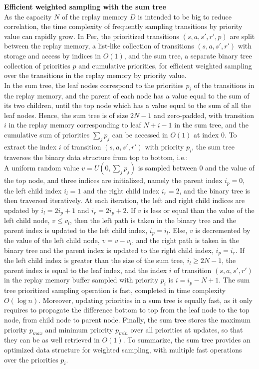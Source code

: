\textbf{Efficient weighted sampling with the sum tree} \\
As the capacity $N$ of the replay memory $D$ is intended to be big to reduce correlation, the time complexity of frequently sampling transitions by priority value can rapidly grow. In Per, the prioritized transitions $(s,a,s',r',p)$ are split between the replay memory, a list-like collection of transitions $(s,a,s',r')$ with storage and access by indices in $O(1)$, and the sum tree, a separate binary tree collection of priorities $p$ and cumulative priorities, for efficient weighted sampling over the transitions in the replay memory by priority value. \\
In the sum tree, the leaf nodes correspond to the priorities $p_i$ of the transitions in the replay memory, and the parent of each node has a value equal to the sum of its two children, until the top node which has a value equal to the sum of all the leaf nodes. Hence, the sum tree is of size $2N - 1$ and zero-padded, with transition $i$ in the replay memory corresponding to leaf $N+i-1$ in the sum tree, and the cumulative sum of priorities $\sum_j p_j$ can be accessed in $O(1)$ at index 0. To extract the index $i$ of transition $(s,a,s',r')$ with priority $p_i$, the sum tree traverses the binary data structure from top to bottom, i.e.: \\
A uniform random value $v = U(0, \sum_j p_j)$ is sampled between 0 and the value of the top node, and three indices are initialized, namely the parent index $i_p=0$, the left child index $i_l=1$ and the right child index $i_r=2$, and the binary tree is then traversed iteratively. At each iteration, the left and right child indices are updated by $i_l=2i_p+1$ and $i_r=2i_p+2$. If $v$ is less or equal than the value of the left child node, $v \leq v_l$, then the left path is taken in the binary tree and the parent index is updated to the left child index, $i_p = i_l$. Else, $v$ is decremented by the value of the left child node, $v = v - v_l$, and the right path is taken in the binary tree and the parent index is updated to the right child index, $i_p = i_r$. If the left child index is greater than the size of the sum tree, $i_l \geq 2N - 1$, the parent index is equal to the leaf index, and the index $i$ of transition $(s,a,s',r')$ in the replay memory buffer sampled with priority $p_i$ is $i = i_p - N + 1$. The sum tree prioritized sampling operation is fast, completed in time complexity $O(\log n)$. Moreover, updating priorities in a sum tree is equally fast, as it only requires to propagate the difference bottom to top from the leaf node to the top node, from child node to parent node. Finally, the sum tree stores the maximum priority $p_{max}$ and minimum priority $p_{min}$ over all priorities at updates, so that they can be as well retrieved in $O(1)$. To summarize, the sum tree provides an optimized data structure for weighted sampling, with multiple fast operations over the priorities $p_i$. \\

